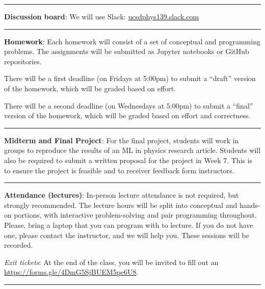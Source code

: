 \documentclass[12pt]{article}
\begin{document}
\begin{center}
	\rule{\textwidth}{0.5pt}
\end{center}

\noindent\textbf{Discussion board}: We will use Slack: \href{https://join.slack.com/t/ucsdphys139/shared\_invite/zt-110gwd4lx-pZBsItfcxhbOD5BV6afVDA}{ucsdphys139.slack.com}

\begin{center}
	\rule{\textwidth}{0.5pt}
\end{center}

\noindent\textbf{Homework}: Each homework will consist of a set of conceptual and programming problems.
The assignments will be submitted as Jupyter notebooks or GitHub repositories.

There will be a first deadline (on Fridays at 5:00pm) to submit a ``draft'' version of the homework, which will be graded based on effort.

There will be a second deadline (on Wednesdays at 5:00pm) to submit a ``final'' version of the homework, which will be graded based on effort and correctness.

\begin{center}
	\rule{\textwidth}{0.5pt}
\end{center}

\noindent\textbf{Midterm and Final Project}:
For the final project, students will work in groups to reproduce the results of an ML in physics research article.
Students will also be required to submit a written proposal for the project in Week 7.
This is to ensure the project is feasible and to receiver feedback form instructors.

\begin{center}
	\rule{\textwidth}{0.5pt}
\end{center}

\noindent\textbf{Attendance (lectures)}: In-person lecture attendance is not required, but strongly recommended.
The lecture hours will be split into conceptual and hands-on portions, with interactive problem-solving and pair programming throughout.
Please, bring a laptop that you can program with to lecture.
If you do not have one, please contact the instructor, and we will help you.
These sessions will be recorded.

\emph{Exit tickets}: At the end of the class, you will be invited to fill out an \href{exit ticket}{https://forms.gle/4DmG5SjBUEM5pe6U8}.

\begin{center}
	\rule{\textwidth}{0.5pt}
\end{center}
\end{document}
